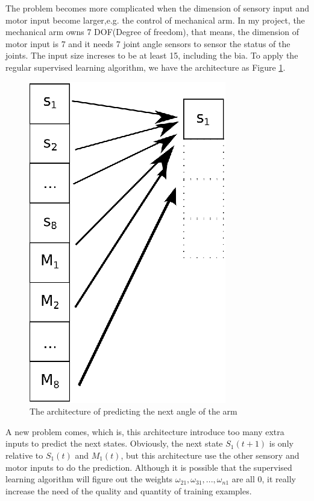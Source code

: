 \documentclass{article}
\begin{document}
The problem becomes more complicated when the dimension of sensory input and motor input become larger,e.g. the control of mechanical arm. In my project, the mechanical arm owns 7 DOF(Degree of freedom), that means, the dimension of motor input is 7 and it needs 7 joint angle sensors to sensor the status of the joints. The input size increses to be at least 15, including the bia. To apply the regular supervised learning algorithm, we have the architecture as Figure \ref{fig:archofnextarm}.
\begin{figure}
  \centering
  \includegraphics[scale=0.5]{fig/archofnextarm.eps}
  \caption{The architecture of predicting the next angle of the arm}
  \label{fig:archofnextarm}
\end{figure}

A new problem comes, which is, this architecture introduce too many extra inputs to predict the next states. Obviously, the next state $S_1(t+1)$ is only relative to $S_1(t)$ and $M_1(t)$, but this architecture use the other sensory and motor inputs to do the prediction. Although it is possible that the supervised learning algorithm will figure out the weights $\omega_{21}, \omega_{31},...,\omega_{n1}$ are all 0, it really increase the need of the quality and quantity of training examples. 
\end{document}
